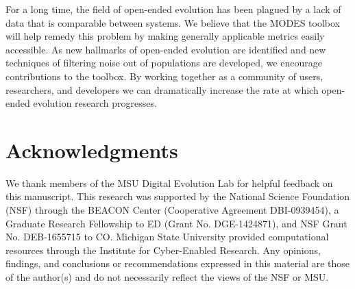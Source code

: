 \documentclass[letterpaper]{article}
\begin{document}


For a long time, the field of open-ended evolution has been plagued by a lack of data that is comparable between systems. We believe that the MODES toolbox will help remedy this problem by making generally applicable metrics easily accessible. As new hallmarks of open-ended evolution are identified and new techniques of filtering noise out of populations are developed, we encourage contributions to the toolbox. By working together as a community of users, researchers, and developers we can dramatically increase the rate at which open-ended evolution research progresses.

\section{Acknowledgments}
We thank members of the MSU Digital Evolution Lab for helpful feedback on this manuscript. This research was supported by the National Science Foundation (NSF) through the BEACON Center (Cooperative Agreement DBI-0939454), a Graduate Research Fellowship to ED (Grant No. DGE-1424871), and NSF Grant No. DEB-1655715 to CO. Michigan State University provided computational resources through the Institute for Cyber-Enabled Research. Any opinions, findings, and conclusions or recommendations expressed in this material are those of the author(s) and do not necessarily reflect the views of the NSF or MSU.



\end{document}
